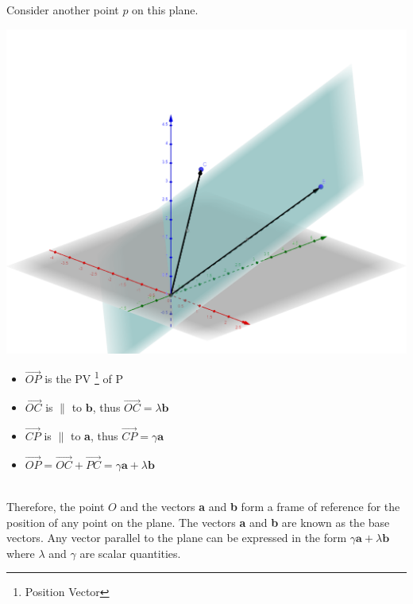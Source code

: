 \documentclass[12pt, a4paper]{report}
\theoremstyle{definition}
\begin{document}
	Consider another point $p$ on this plane.
		\begin{multicols}{2}
		\begin{center}
			\includegraphics[scale=0.16]{vect_2} 
		\end{center}
		\begin{itemize}
			\item{$\vec{OP}$ is the PV \footnote{Position Vector} of P}
			
		\item{	$\overrightarrow{OC}$ is $\parallel$ to $\textbf{b}$, thus $\overrightarrow{OC} = \lambda \textbf{b}$}
		\item{$\overrightarrow{CP}$ is $\parallel$ to \textbf{a}, thus $\overrightarrow{CP} = \gamma \textbf{a}$}
		\item{$\overrightarrow{OP} = \overrightarrow{OC} + \overrightarrow{PC}	 =\gamma \textbf{a} + \lambda \textbf{b}$}
		\end{itemize}
		
	\end{multicols}
	~\\
	
	Therefore, the point $O$ and the vectors \textbf{a} and \textbf{b} form a frame of reference for the position of any point on the plane. The vectors \textbf{a} and \textbf{b} are known as the base vectors. Any vector parallel to the plane can be expressed in the form $\gamma \textbf{a} + \lambda \textbf{b}$ where $\lambda$ and $\gamma$ are scalar quantities.\\
	
\end{document}
